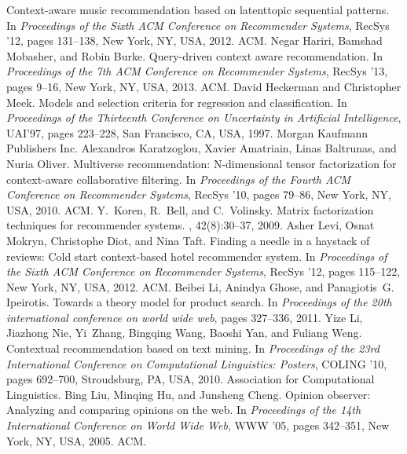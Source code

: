 \documentclass{llncs}
\begin{document}
\begin{thebibliography}{10}
\newblock Context-aware music recommendation based on latenttopic sequential
patterns.
\newblock In {\em Proceedings of the Sixth ACM Conference on Recommender
Systems}, RecSys '12, pages 131--138, New York, NY, USA, 2012. ACM.
Negar Hariri, Bamshad Mobasher, and Robin Burke.
\newblock Query-driven context aware recommendation.
\newblock In {\em Proceedings of the 7th ACM Conference on Recommender
Systems}, RecSys '13, pages 9--16, New York, NY, USA, 2013. ACM.
David Heckerman and Christopher Meek.
\newblock Models and selection criteria for regression and classification.
\newblock In {\em Proceedings of the Thirteenth Conference on Uncertainty in
Artificial Intelligence}, UAI'97, pages 223--228, San Francisco, CA, USA,
1997. Morgan Kaufmann Publishers Inc.
Alexandros Karatzoglou, Xavier Amatriain, Linas Baltrunas, and Nuria Oliver.
\newblock Multiverse recommendation: N-dimensional tensor factorization for
context-aware collaborative filtering.
\newblock In {\em Proceedings of the Fourth ACM Conference on Recommender
Systems}, RecSys '10, pages 79--86, New York, NY, USA, 2010. ACM.
Y.~Koren, R.~Bell, and C.~Volinsky.
\newblock Matrix factorization techniques for recommender systems.
, 42(8):30--37, 2009.
Asher Levi, Osnat Mokryn, Christophe Diot, and Nina Taft.
\newblock Finding a needle in a haystack of reviews: Cold start context-based
hotel recommender system.
\newblock In {\em Proceedings of the Sixth ACM Conference on Recommender
Systems}, RecSys '12, pages 115--122, New York, NY, USA, 2012. ACM.
Beibei Li, Anindya Ghose, and Panagiotis~G. Ipeirotis.
\newblock Towards a theory model for product search.
\newblock In {\em Proceedings of the 20th international conference on world
wide web}, pages 327--336, 2011.
Yize Li, Jiazhong Nie, Yi~Zhang, Bingqing Wang, Baoshi Yan, and Fuliang Weng.
\newblock Contextual recommendation based on text mining.
\newblock In {\em Proceedings of the 23rd International Conference on
Computational Linguistics: Posters}, COLING '10, pages 692--700, Stroudsburg,
PA, USA, 2010. Association for Computational Linguistics.
Bing Liu, Minqing Hu, and Junsheng Cheng.
\newblock Opinion observer: Analyzing and comparing opinions on the web.
\newblock In {\em Proceedings of the 14th International Conference on World
Wide Web}, WWW '05, pages 342--351, New York, NY, USA, 2005. ACM.

\end{thebibliography}
\end{document}
